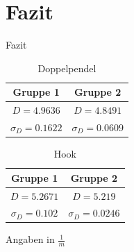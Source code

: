 \documentclass[11pt]{beamer}
\begin{document}
\section{Fazit}
\begin{frame}{Fazit}
\begin{multicols}{2}
\begin{table}[H]\centering
\caption{Doppelpendel}
\begin{tabular}{c|c}
Gruppe 1 & Gruppe 2\\ 
\hline
$D=4.9636$& $D=4.8491 $\\ 
$\sigma_D=0.1622 $& $\sigma_D=0.0609 $\\
\end{tabular} 
\end{table}
\columnbreak
\begin{table}[H]\centering
\caption{Hook}
\begin{tabular}{c|c}
Gruppe 1 & Gruppe 2\\ 
\hline
$D=5.2671 $& $D=5.219 $\\ 
$\sigma_D=0.102 $& $\sigma_D=0.0246 $\\
\end{tabular} 
\end{table}
\end{multicols}
Angaben in $\frac{1}{m}$
\end{frame}
\end{document}
